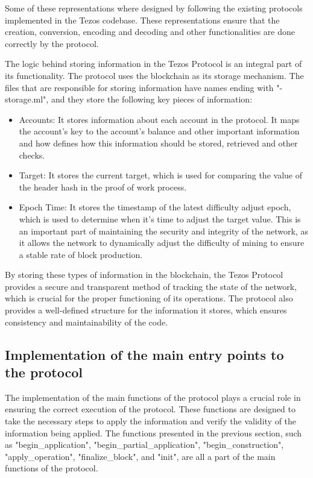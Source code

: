 Some of these representations where designed by following the existing protocols implemented in the Tezos codebase. These representations ensure that the creation, conversion, encoding and decoding and other functionalities are done correctly by the protocol.

The logic behind storing information in the Tezos Protocol is an integral part of its functionality. The protocol uses the blockchain as its storage mechanism. 
The files that are responsible for storing information have names ending with "-storage.ml", and they store the following key pieces of information:
\begin{itemize}
    \item Accounts: It stores information about each account in the protocol. It maps the account's key to the account's balance and other important information and how defines how this information should be stored, retrieved and other checks.

    \item Target: It stores the current target, which is used for comparing the value of the header hash in the proof of work process.

    \item Epoch Time: It stores the timestamp of the latest difficulty adjust epoch, which is used to determine when it's time to adjust the target value. This is an important part of maintaining the security and integrity of the network, as it allows the network to dynamically adjust the difficulty of mining to ensure a stable rate of block production.
\end{itemize}

By storing these types of information in the blockchain, the Tezos Protocol provides a secure and transparent method of tracking the state of the network, which is crucial for the proper functioning of its operations. The protocol also provides a well-defined structure for the information it stores, which ensures consistency and maintainability of the code.

\subsection*{Implementation of the main entry points to the protocol}

The implementation of the main functions of the protocol plays a crucial role in ensuring the correct execution of the protocol. These functions are designed to take the necessary steps to apply the information and verify the validity of the information being applied. The functions presented in the previous section, such as "begin\_application", "begin\_partial\_application", "begin\_construction", "apply\_operation", "finalize\_block", and "init", are all a part of the main functions of the protocol.

